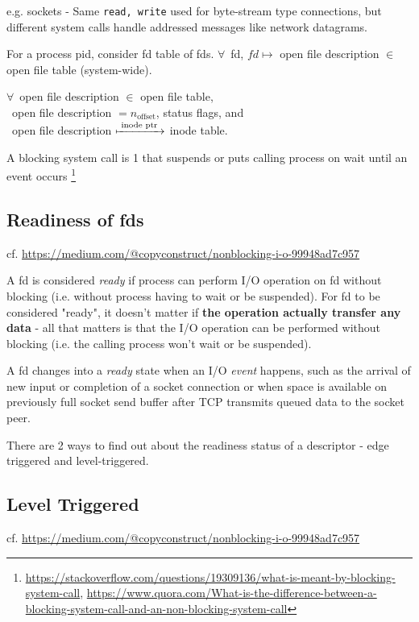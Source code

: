 \documentclass[10pt]{amsart}
\begin{document}
\begin{multicols*}{2}
e.g. sockets - Same \texttt{read, write} used for byte-stream type connections, but different system calls handle addressed messages like network datagrams.


For a process pid, consider fd table of fds. $\forall \, $ fd, $fd \mapsto $ open file description $\in$ open file table (system-wide).

$\forall \, $ open file description $\in $ open file table, \\
\qquad \, open file description $= n_{\text{offset}}$, status flags, and \\
\qquad \, open file description $\xmapsto{ \text{ inode ptr } }$ inode table.

A blocking system call is 1 that suspends or puts calling process on wait until an event occurs \footnote{\url{https://stackoverflow.com/questions/19309136/what-is-meant-by-blocking-system-call}, \url{https://www.quora.com/What-is-the-difference-between-a-blocking-system-call-and-an-non-blocking-system-call}}

\subsection{Readiness of fds}

cf. \url{https://medium.com/@copyconstruct/nonblocking-i-o-99948ad7c957}

A fd is considered \emph{ready} if process can perform I/O operation on fd without blocking (i.e. without process having to wait or be suspended). For fd to be considered "ready", it doesn't matter if \textbf{the operation actually transfer any data} - all that matters is that the I/O operation can be performed without blocking (i.e. the calling process won't wait or be suspended).

A fd changes into a \emph{ready} state when an I/O \emph{event} happens, such as the arrival of new input or completion of a socket connection or when space is available on previously full socket send buffer after TCP transmits queued data to the socket peer.

There are 2 ways to find out about the readiness status of a descriptor - edge triggered and level-triggered.

\subsection{Level Triggered}

cf. \url{https://medium.com/@copyconstruct/nonblocking-i-o-99948ad7c957}


\end{multicols*}
\end{document}
